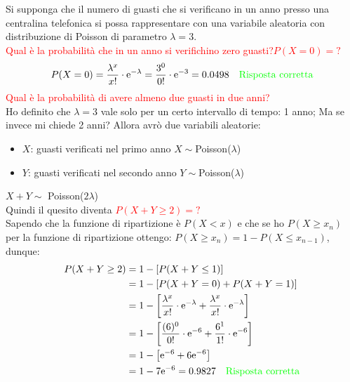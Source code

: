 \documentclass{article}  %
\theoremstyle{definition}
\begin{document}
\begin{esercizio}[Esercizio]
	Si supponga che il numero di guasti che si verificano in un anno presso una centralina telefonica si possa rappresentare con una variabile aleatoria con distribuzione di Poisson di
	parametro $\lambda=3$. \\ \textcolor{red}{Qual è la probabilità che in un anno si verifichino zero guasti?$P(X=0)=?$}
	\[
		P(X=0)=\frac{\lambda^x}{x!} \cdot \mathrm{e}^{-\lambda}=\frac{3^0}{0!} \cdot \mathrm{e}^{-3}=0.0498 \quad \textcolor{green}{\text{Risposta corretta}}
	\]
	\textcolor{red}{Qual è la probabilità di avere almeno due guasti in due anni?} \\
	Ho definito che $\lambda=3$ vale solo per un certo intervallo di tempo: 1 anno; Ma se invece mi chiede 2 anni?
	Allora avrò due variabili aleatorie:
	\begin{itemize}
		\item $X$: guasti verificati nel primo anno $X \sim$Poisson($\lambda$)
		\item $Y$: guasti verificati nel secondo anno $Y \sim$Poisson($\lambda$)
	\end{itemize}
	$X + Y \sim$ Poisson($2\lambda$) \\
	Quindi il quesito diventa \textcolor{red}{$P(X+Y \geq 2)=?$} \\
	Sapendo che la funzione di ripartizione è $P(X < x)$ e che se ho $P(X \geq x_n)$ per la funzione di ripartizione ottengo: $P(X \geq x_n)=1-P(X \leq x_{n-1})$, dunque:
	\begin{align*}
		P(X+Y \geq 2)
		 & = 1-\left[P(X + Y \leq 1)\right]                                                                                 \\
		 & = 1-\left[P(X + Y = 0)+P(X + Y = 1)\right]                                                                       \\
		 & = 1-\left[\frac{\lambda^x}{x!}\cdot \mathrm{e}^{-\lambda}+\frac{\lambda^x}{x!}\cdot \mathrm{e}^{-\lambda}\right] \\
		 & = 1-\left[\frac{(6)^0}{0!}\cdot \mathrm{e}^{-6}+\frac{6^1}{1!}\cdot \mathrm{e}^{-6}\right]                       \\
		 & = 1-\left[\mathrm{e}^{-6}+6\mathrm{e}^{-6}\right]                                                                \\
		 & = 1-7\mathrm{e}^{-6}= 0.9827 \quad \textcolor{green}{\text{Risposta corretta}}
	\end{align*}
\end{esercizio}
\end{document}
